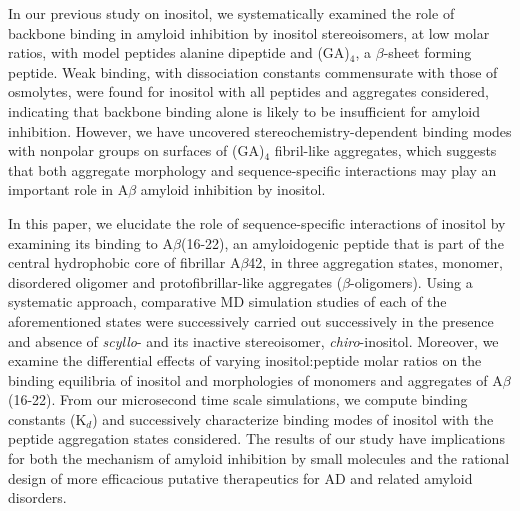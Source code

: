 In our previous study on inositol,\cite{Li:2012p853} we systematically examined the role of backbone binding in amyloid inhibition by inositol stereoisomers, at low molar ratios, with model peptides alanine dipeptide and (GA)$_4$, a $\beta$-sheet forming peptide. Weak binding, with dissociation constants commensurate with those of osmolytes, were found for inositol with all peptides and aggregates considered, indicating that backbone binding alone is likely to be insufficient for amyloid inhibition. However, we have uncovered stereochemistry-dependent binding modes with nonpolar groups on surfaces of (GA)$_4$ fibril-like aggregates, which suggests that both aggregate morphology and sequence-specific interactions may play an important role in A$\beta$ amyloid inhibition by inositol.  

In this paper, we elucidate the role of sequence-specific interactions of inositol by examining its binding to A$\beta$(16-22), an amyloidogenic peptide that is part of the central hydrophobic core of fibrillar A$\beta$42, in three aggregation states, monomer, disordered oligomer and protofibrillar-like aggregates ($\beta$-oligomers).  Using a systematic approach, comparative MD simulation studies of each of the aforementioned states were successively carried out successively in the presence and absence of \emph{scyllo}- and its inactive stereoisomer, \emph{chiro}-inositol.  Moreover, we examine the differential effects of varying inositol:peptide molar ratios on the binding equilibria of inositol and morphologies of monomers and aggregates of A$\beta$(16-22). From our microsecond time scale simulations, we compute binding constants (K$_{d}$) and successively characterize binding modes of inositol with the peptide aggregation states considered. The results of our study have implications for both the mechanism of amyloid inhibition by small molecules and the rational design of more efficacious putative therapeutics for AD and related amyloid disorders.



